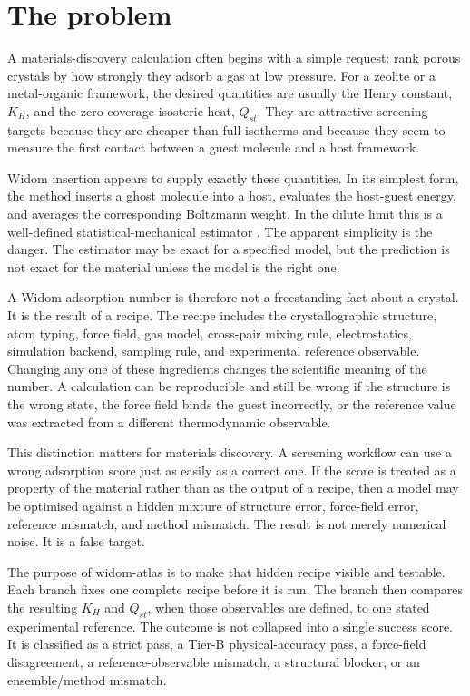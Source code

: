 \section{The problem}\label{sec:problem}

A materials-discovery calculation often begins with a simple request: rank porous crystals by how strongly they adsorb a gas at low pressure. For a zeolite or a metal-organic framework, the desired quantities are usually the Henry constant, \(K_H\), and the zero-coverage isosteric heat, \(Q_{st}\). They are attractive screening targets because they are cheaper than full isotherms and because they seem to measure the first contact between a guest molecule and a host framework.

Widom insertion appears to supply exactly these quantities. In its simplest form, the method inserts a ghost molecule into a host, evaluates the host-guest energy, and averages the corresponding Boltzmann weight. In the dilute limit this is a well-defined statistical-mechanical estimator \cite{FrenkelSmit2002}. The apparent simplicity is the danger. The estimator may be exact for a specified model, but the prediction is not exact for the material unless the model is the right one.

A Widom adsorption number is therefore not a freestanding fact about a crystal. It is the result of a recipe. The recipe includes the crystallographic structure, atom typing, force field, gas model, cross-pair mixing rule, electrostatics, simulation backend, sampling rule, and experimental reference observable. Changing any one of these ingredients changes the scientific meaning of the number. A calculation can be reproducible and still be wrong if the structure is the wrong state, the force field binds the guest incorrectly, or the reference value was extracted from a different thermodynamic observable.

This distinction matters for materials discovery. A screening workflow can use a wrong adsorption score just as easily as a correct one. If the score is treated as a property of the material rather than as the output of a recipe, then a model may be optimised against a hidden mixture of structure error, force-field error, reference mismatch, and method mismatch. The result is not merely numerical noise. It is a false target.

The purpose of widom-atlas is to make that hidden recipe visible and testable. Each branch fixes one complete recipe before it is run. The branch then compares the resulting \(K_H\) and \(Q_{st}\), when those observables are defined, to one stated experimental reference. The outcome is not collapsed into a single success score. It is classified as a strict pass, a Tier-B physical-accuracy pass, a force-field disagreement, a reference-observable mismatch, a structural blocker, or an ensemble/method mismatch.

